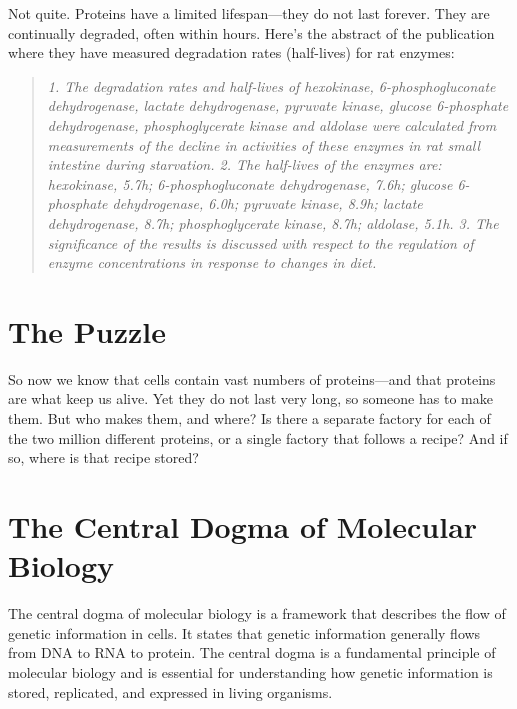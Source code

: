 Not quite. Proteins have a limited lifespan—they do not last forever. They are continually degraded, often within hours. Here's the abstract of the publication where they have measured degradation rates (half-lives) for rat enzymes:

\begin{quote}
    \textit{1. The degradation rates and half-lives of hexokinase, 6-phosphogluconate dehydrogenase, lactate dehydrogenase, pyruvate kinase, glucose 6-phosphate dehydrogenase, phosphoglycerate kinase and aldolase were calculated from measurements of the decline in activities of these enzymes in rat small intestine during starvation. 2. The half-lives of the enzymes are: hexokinase, 5.7h; 6-phosphogluconate dehydrogenase, 7.6h; glucose 6-phosphate dehydrogenase, 6.0h; pyruvate kinase, 8.9h; lactate dehydrogenase, 8.7h; phosphoglycerate kinase, 8.7h; aldolase, 5.1h. 3. The significance of the results is discussed with respect to the regulation of enzyme concentrations in response to changes in diet.}
\end{quote}

\section{The Puzzle}

So now we know that cells contain vast numbers of proteins—and that proteins are what keep us alive. Yet they do not last very long, so someone has to make them. But who makes them, and where? Is there a separate factory for each of the two million different proteins, or a single factory that follows a recipe? And if so, where is that recipe stored?

\section{The Central Dogma of Molecular Biology}

The central dogma of molecular biology is a framework that describes the flow of genetic information in cells. It states that genetic information generally flows from DNA to RNA to protein. The central dogma is a fundamental principle of molecular biology and is essential for understanding how genetic information is stored, replicated, and expressed in living organisms.


